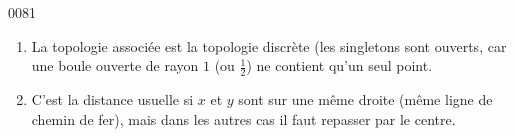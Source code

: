 
\begin{corrige}{0081}


\begin{enumerate}
\item
 La topologie associée est la topologie discrète (les singletons sont ouverts, car une boule ouverte de rayon $1$ (ou $\frac12$) ne contient qu'un seul point.

\item
 C'est la distance usuelle si $x$ et $y$ sont sur une même droite (même ligne de chemin de fer), mais dans les autres cas il faut repasser par le centre.
\end{enumerate}


\end{corrige}
